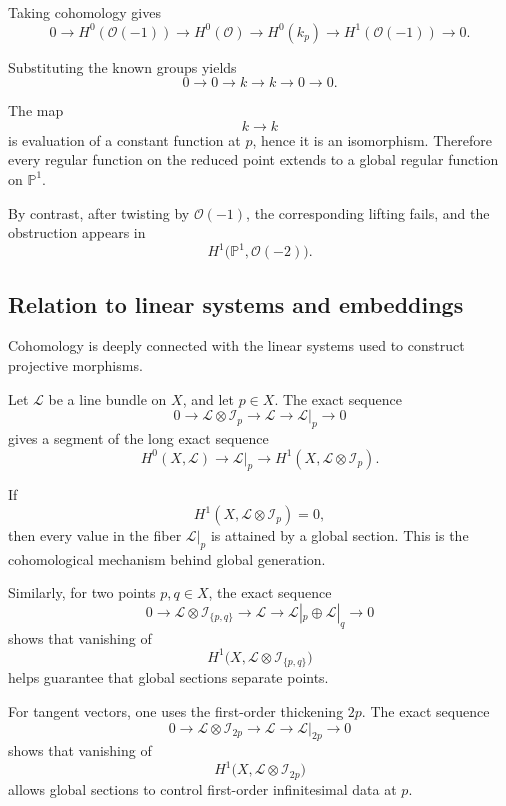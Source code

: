 \documentclass[12pt,a4paper]{article}
\theoremstyle{notespace}
\begin{document}
Taking cohomology gives
\[
0
\longrightarrow
H^{0}(\mathcal{O}(-1))
\longrightarrow
H^{0}(\mathcal{O})
\longrightarrow
H^{0}(k_{p})
\longrightarrow
H^{1}(\mathcal{O}(-1))
\longrightarrow
0.
\]

Substituting the known groups yields
\[
0
\longrightarrow
0
\longrightarrow
k
\longrightarrow
k
\longrightarrow
0
\longrightarrow
0.
\]

The map
\[
k\longrightarrow k
\]
is evaluation of a constant function at \(p\), hence it is an isomorphism.
Therefore every regular function on the reduced point extends to a global
regular function on \(\mathbb{P}^{1}\).

By contrast, after twisting by \(\mathcal{O}(-1)\), the corresponding lifting
fails, and the obstruction appears in
\[
H^{1}\bigl(\mathbb{P}^{1},\mathcal{O}(-2)\bigr).
\]

\subsection{Relation to linear systems and embeddings}

Cohomology is deeply connected with the linear systems used to construct
projective morphisms.

Let \(\mathcal{L}\) be a line bundle on \(X\), and let \(p\in X\). The exact
sequence
\[
0
\longrightarrow
\mathcal{L}\otimes\mathcal{I}_{p}
\longrightarrow
\mathcal{L}
\longrightarrow
\mathcal{L}|_{p}
\longrightarrow
0
\]
gives a segment of the long exact sequence
\[
H^{0}(X,\mathcal{L})
\longrightarrow
\mathcal{L}|_{p}
\longrightarrow
H^{1}(X,\mathcal{L}\otimes\mathcal{I}_{p}).
\]

If
\[
H^{1}(X,\mathcal{L}\otimes\mathcal{I}_{p})=0,
\]
then every value in the fiber \(\mathcal{L}|_{p}\) is attained by a global
section. This is the cohomological mechanism behind global generation.

Similarly, for two points \(p,q\in X\), the exact sequence
\[
0
\longrightarrow
\mathcal{L}\otimes\mathcal{I}_{\{p,q\}}
\longrightarrow
\mathcal{L}
\longrightarrow
\mathcal{L}|_{p}\oplus\mathcal{L}|_{q}
\longrightarrow
0
\]
shows that vanishing of
\[
H^{1}\bigl(X,\mathcal{L}\otimes\mathcal{I}_{\{p,q\}}\bigr)
\]
helps guarantee that global sections separate points.

For tangent vectors, one uses the first-order thickening \(2p\). The exact
sequence
\[
0
\longrightarrow
\mathcal{L}\otimes\mathcal{I}_{2p}
\longrightarrow
\mathcal{L}
\longrightarrow
\mathcal{L}|_{2p}
\longrightarrow
0
\]
shows that vanishing of
\[
H^{1}\bigl(X,\mathcal{L}\otimes\mathcal{I}_{2p}\bigr)
\]
allows global sections to control first-order infinitesimal data at \(p\).
\end{document}
